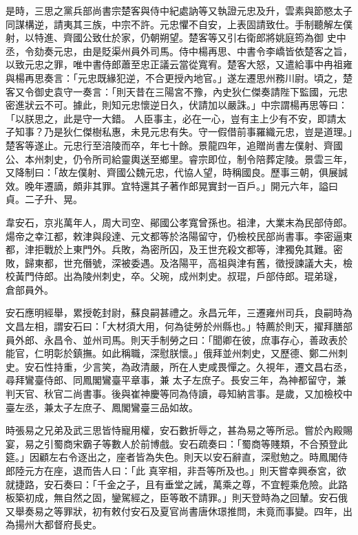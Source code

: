 \begin{pinyinscope}
 是時，三思之黨兵部尚書宗楚客與侍中紀處訥等又執證元忠及升，雲素與節愍太子同謀構逆，請夷其三族，中宗不許。元忠懼不自安，上表固請致仕。手制聽解左僕射，以特進、齊國公致仕於家，仍朝朔望。楚客等又引右衛郎將姚庭筠為御
 史中丞，令劾奏元忠，由是貶渠州員外司馬。侍中楊再思、中書令李嶠皆依楚客之旨，以致元忠之罪，唯中書侍郎蕭至忠正議云當從寬宥。楚客大怒，又遣給事中冉祖雍與楊再思奏言：「元忠既緣犯逆，不合更授內地官。」遂左遷思州務川尉。頃之，楚客又令御史袁守一奏言：「則天昔在三陽宮不豫，內史狄仁傑奏請陛下監國，元忠密進狀云不可。據此，則知元忠懷逆日久，伏請加以嚴誅。」中宗謂楊再思等曰：「以朕思之，此是守一大錯。
 人臣事主，必在一心，豈有主上少有不安，即請太子知事？乃是狄仁傑樹私惠，未見元忠有失。守一假借前事羅織元忠，豈是道理。」楚客等遂止。元忠行至涪陵而卒，年七十餘。景龍四年，追贈尚書左僕射、齊國公、本州刺史，仍令所司給靈輿送至鄉里。睿宗即位，制令陪葬定陵。景雲三年，又降制曰：「故左僕射、齊國公魏元忠，代協人望，時稱國良。歷事三朝，俱展誠效。晚年遷謫，頗非其罪。宜特還其子著作郎晃實封一百戶。」開元六年，謚曰
 貞。二子升、晃。



 韋安石，京兆萬年人，周大司空、鄖國公孝寬曾孫也。祖津，大業末為民部侍郎。煬帝之幸江都，敕津與段達、元文都等於洛陽留守，仍檢校民部尚書事。李密逼東都，津拒戰於上東門外。兵敗，為密所囚，及王世充殺文都等，津獨免其難。密敗，歸東都，世充僭號，深被委遇。及洛陽平，高祖與津有舊，徵授諫議大夫，檢校黃門侍郎。出為陵州刺史，卒。父琬，成州刺史。叔琨，戶部侍郎。琨弟璲，
 倉部員外。



 安石應明經舉，累授乾封尉，蘇良嗣甚禮之。永昌元年，三遷雍州司兵，良嗣時為文昌左相，謂安石曰：「大材須大用，何為徒勞於州縣也。」特薦於則天，擢拜膳部員外郎、永昌令、並州司馬。則天手制勞之曰：「聞卿在彼，庶事存心，善政表於能官，仁明彰於鎮撫。如此稱職，深慰朕懷。」俄拜並州刺史，又歷德、鄭二州刺史。安石性持重，少言笑，為政清嚴，所在人吏咸畏憚之。久視年，遷文昌右丞，尋拜鸞臺侍郎、同鳳閣鸞臺平章事，兼
 太子左庶子。長安三年，為神都留守，兼判天官、秋官二尚書事。後與崔神慶等同為侍讀，尋知納言事。是歲，又加檢校中臺左丞，兼太子左庶子、鳳閣鸞臺三品如故。



 時張易之兄弟及武三思皆恃寵用權，安石數折辱之，甚為易之等所忌。嘗於內殿賜宴，易之引蜀商宋霸子等數人於前博戲。安石疏奏曰：「蜀商等賤類，不合預登此筵。」因顧左右令逐出之，座者皆為失色。則天以安石辭直，深慰勉之。時鳳閣侍郎陸元方在座，退而告人曰：「此
 真宰相，非吾等所及也。」則天嘗幸興泰宮，欲就捷路，安石奏曰：「千金之子，且有垂堂之誡，萬乘之尊，不宜輕乘危險。此路板築初成，無自然之固，鑾駕經之，臣等敢不請罪。」則天登時為之回輦。安石俄又舉奏易之等罪狀，初有敕付安石及夏官尚書唐休璟推問，未竟而事變。四年，出為揚州大都督府長史。




\end{pinyinscope}
